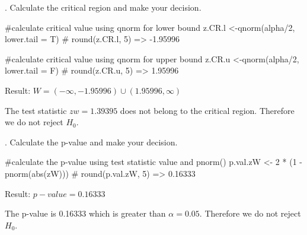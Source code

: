 \documentclass[12pt, oneside]{report}\usepackage[]{graphicx}\usepackage[]{color}
\begin{document}
. Calculate the critical region and make your decision.
\begin{Schunk}
\begin{Sinput}
#calculate critical value using qnorm for lower bound
z.CR.l <-qnorm(alpha/2, lower.tail = T)
# round(z.CR.l, 5) => -1.95996

#calculate critical value using qnorm for upper bound
z.CR.u <-qnorm(alpha/2, lower.tail = F)
# round(z.CR.u, 5) => 1.95996
\end{Sinput}
\end{Schunk}

Result: $W = (-\infty, -1.95996) \cup (1.95996, \infty) $ \newline

The test statistic $zw = 1.39395$ does not belong to the critical region. Therefore we do not reject $H_0$. \newline

. Calculate the p-value and make your decision.
\begin{Schunk}
\begin{Sinput}
#calculate the p-value using test statistic value and pnorm()
p.val.zW <- 2 * (1 - pnorm(abs(zW)))
# round(p.val.zW, 5) => 0.16333
\end{Sinput}
\end{Schunk}

Result: $p-value = 0.16333$ \newline

The p-value is 0.16333 which is greater than $\alpha = 0.05$. Therefore we do not reject $H_0$. \newline
\end{document}
